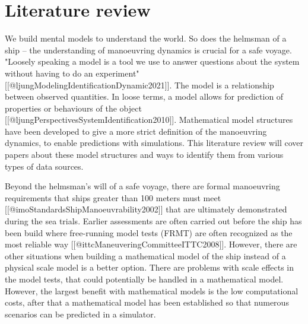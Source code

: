 \section{Literature review}
%
%
%
%
We build mental models to understand the world. So does the helmsman of a ship – the understanding of manoeuvring dynamics is crucial for a safe voyage. "Loosely speaking a model is a tool we use to answer questions about the system without having to do an experiment" [[@ljungModelingIdentificationDynamic2021]]. The model is a relationship between observed quantities. In loose terms, a model allows for prediction of properties or behaviours of the object [[@ljungPerspectivesSystemIdentification2010]].
Mathematical model structures have been developed to give a more strict definition of the manoeuvring dynamics, to enable predictions with simulations. This literature review will cover papers about these model structures and ways to identify them from various types of data sources.

Beyond the helmsman's will of a safe voyage, there are formal manoeuvring requirements that ships greater than 100 meters must meet  [[@imoStandardsShipManoeuvrability2002]] that are ultimately demonstrated during the sea trials. Earlier assessments are often carried out before the ship has been build where free-running model tests (FRMT) are often recognized as the most reliable way [[@ittcManeuveringCommitteeITTC2008]]. However, there are other situations when building a mathematical model of the ship instead of a physical scale model is a better option.  There are problems with scale effects in the model tests, that could potentially be handled in a mathematical model.  However, the largest benefit with mathematical models is the low  computational costs, after that a mathematical model has been established so that numerous scenarios can be predicted in a simulator.

